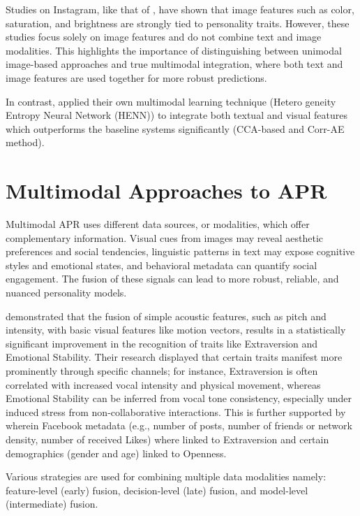 Studies on Instagram, like that of \citet{Ferwerda2016}, have shown that image features such as color, saturation, and brightness are strongly tied to personality traits. However, these studies focus solely on image features and do not combine text and image modalities. This highlights the importance of distinguishing between unimodal image-based approaches and true multimodal integration, where both text and image features are used together for more robust predictions.

In contrast, \citet{Xianyu2016} applied their own multimodal learning technique (Hetero
geneity Entropy Neural Network (HENN)) to integrate both textual and visual features which outperforms the baseline systems significantly (CCA-based and Corr-AE method).

\section{Multimodal Approaches to APR}
\label{sec: MMApproaches}
Multimodal APR uses different data sources, or modalities, which offer complementary information. Visual cues from images may reveal aesthetic preferences and social tendencies, linguistic patterns in text may expose cognitive styles and emotional states, and behavioral metadata can quantify social engagement. The fusion of these signals can lead to more robust, reliable, and nuanced personality models.

\cite{batrinca_multimodal_2016} demonstrated that the fusion of simple acoustic features, such as pitch and intensity, with basic visual features like motion vectors, results in a statistically significant improvement in the recognition of traits like Extraversion and Emotional Stability. Their research displayed that certain traits manifest more prominently through specific channels; for instance, Extraversion is often correlated with increased vocal intensity and physical movement, whereas Emotional Stability can be inferred from vocal tone consistency, especially under induced stress from non-collaborative interactions. This is further supported by \cite{azucar_predicting_2018} wherein Facebook metadata (e.g., number of posts, number of
friends or network density, number of received Likes) where linked to Extraversion and certain demographics (gender and age) linked to Openness.

Various strategies are used for combining multiple data modalities namely: feature-level (early) fusion, decision-level (late) fusion, and model-level (intermediate) fusion.  

